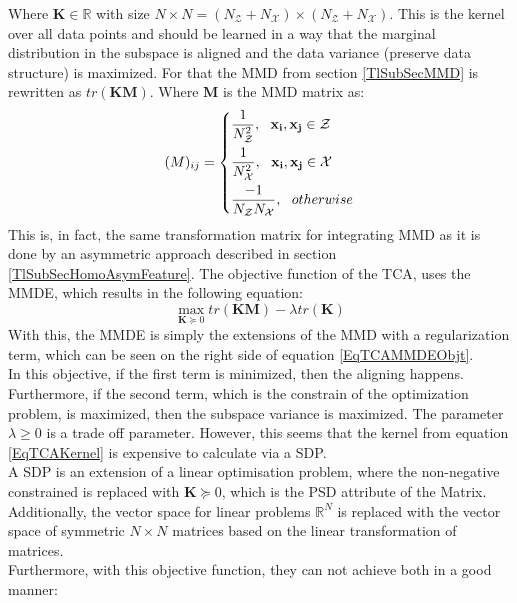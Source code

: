 Where $\mathbf{K} \in \mathbb{R}$ with size $N\times N = (N_\mathcal{Z} + N_\mathcal{X}) \times (N_\mathcal{Z}+ N_\mathcal{X})$.
This is the kernel over all data points and should be learned in a way that the marginal distribution in the subspace is aligned and the data variance (preserve data structure) is maximized.
For that the \acs{MMD} from section \ref{TlSubSecMMD} is rewritten as $tr(\mathbf{KM})$.
Where $\mathbf{M}$ is the \acs{MMD} matrix as:\cite{Pan.2011}
\begin{equation}\label{EqTCAMMD}
(M)_{ij}= \begin{dcases}
\frac{1}{N_\mathcal{Z}^2},\>\>\> \mathbf{x_i},\mathbf{x_j} \in \mathcal{Z}\\
\frac{1}{N_\mathcal{X}^2},\>\>\> \mathbf{x_i},\mathbf{x_j} \in \mathcal{X}\\
\frac{-1}{N_\mathcal{Z}N_\mathcal{X}},\>\>\> otherwise
\end{dcases}
\end{equation}
This is, in fact, the same transformation matrix for integrating \acs{MMD} as it is done by an asymmetric approach described in section \ref{TlSubSecHomoAsymFeature}.
The objective function of the \acs{TCA}, uses the \acl{MMDE}, which results in the following equation:\cite{Pan.2011}
\begin{equation}\label{EqTCAMMDEObjt}
	\max_{\mathbf{K}\succeq 0} tr(\mathbf{KM}) - \lambda tr(\mathbf{K})
\end{equation}
With this, the \acs{MMDE} is simply the extensions of the \ac{MMD} with a regularization term, which can be seen on the right side of equation \eqref{EqTCAMMDEObjt}.\cite{Pan.2011}\\
In this objective, if the first term is minimized, then the aligning happens.
Furthermore, if the second term, which is the constrain of the optimization problem, is maximized, then the subspace variance is maximized.
The parameter $\lambda \ge 0$ is a trade off parameter.
However, this seems that the kernel from equation \eqref{EqTCAKernel} is expensive to calculate via a \ac{SDP}.\cite{Pan.2011}\\
A \acs{SDP} is an extension of a linear optimisation problem, where the non-negative constrained is replaced with $\mathbf{K}\succeq 0$, which is the \acs{PSD} attribute of the Matrix. Additionally, the vector space for linear problems $\mathbb{R}^N$ is replaced with the vector space of symmetric $N\times N$ matrices based on the linear transformation of matrices.\cite{Gartner.2012}\\
Furthermore, with this objective function, they can not achieve both in a good manner:
